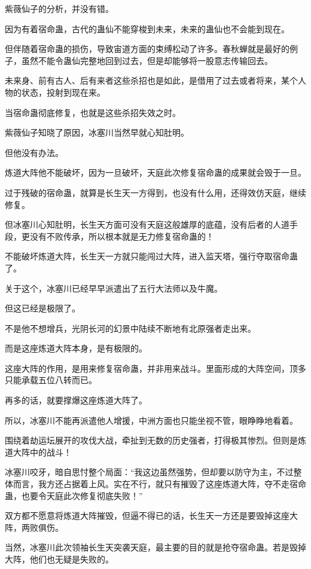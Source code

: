 
\begin{this_body}

紫薇仙子的分析，并没有错。

因为有着宿命蛊，古代的蛊仙不能穿梭到未来，未来的蛊仙也不会能到现在。

但伴随着宿命蛊的损伤，导致宙道方面的束缚松动了许多。春秋蝉就是最好的例子，虽然不能令蛊仙完整地回到过去，但是却能够将一股意志传输回去。

未来身、前有古人、后有来者这些杀招也是如此，是借用了过去或者将来，某个人物的状态，投射到现在来。

当宿命蛊彻底修复，也就是这些杀招失效之时。

紫薇仙子知晓了原因，冰塞川当然早就心知肚明。

但他没有办法。

炼道大阵他不能破坏，因为一旦破坏，天庭此次修复宿命蛊的成果就会毁于一旦。

过于残破的宿命蛊，就算是长生天一方得到，也没有什么用，还得效仿天庭，继续修复。

但冰塞川心知肚明，长生天方面可没有天庭这般雄厚的底蕴，没有后者的人道手段，更没有不败传承，所以根本就是无力修复宿命蛊的！

不能破坏炼道大阵，长生天一方就只能闯过大阵，进入监天塔，强行夺取宿命蛊了。

关于这个，冰塞川已经早早派遣出了五行大法师以及牛魔。

但这已经是极限了。

不是他不想增兵，光阴长河的幻景中陆续不断地有北原强者走出来。

而是这座炼道大阵本身，是有极限的。

这座大阵的作用，是用来修复宿命蛊，并非用来战斗。里面形成的大阵空间，顶多只能承载五位八转而已。

再多的话，就要撑爆这座炼道大阵了。

所以，冰塞川不能再派遣他人增援，中洲方面也只能坐视不管，眼睁睁地看着。

围绕着劫运坛展开的攻伐大战，牵扯到无数的历史强者，打得极其惨烈。但则是炼道大阵中的战斗！

冰塞川咬牙，暗自思忖整个局面：“我这边虽然强势，但却要以防守为主，不过整体而言，我方还占据着上风。实在不行，就只有摧毁了这座炼道大阵，夺不走宿命蛊，也要令天庭此次修复彻底失败！”

双方都不愿意将炼道大阵摧毁，但逼不得已的话，长生天一方还是要毁掉这座大阵，两败俱伤。

当然，冰塞川此次领袖长生天突袭天庭，最主要的目的就是抢夺宿命蛊。若是毁掉大阵，他们也无疑是失败的。


\end{this_body}
